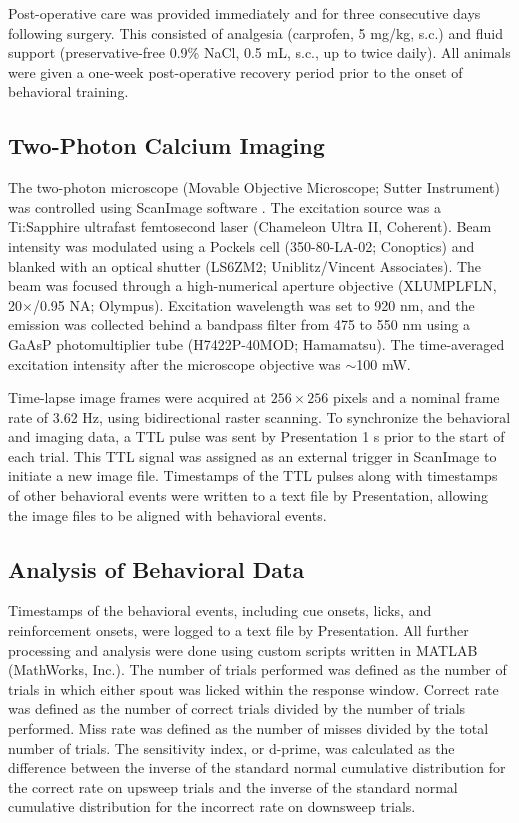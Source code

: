 Post-operative care was provided immediately and for three consecutive days following surgery. This consisted of analgesia (carprofen, 5 mg/kg, s.c.) and fluid support (preservative-free 0.9\% NaCl, 0.5 mL, s.c., up to twice daily). All animals were given a one-week post-operative recovery period prior to the onset of behavioral training.

\subsection*{Two-Photon Calcium Imaging}
The two-photon microscope (Movable Objective Microscope; Sutter Instrument) was controlled using ScanImage software \citep{pologruto2003scanimage}. The excitation source was a Ti:Sapphire ultrafast femtosecond laser (Chameleon Ultra II, Coherent). Beam intensity was modulated using a Pockels cell (350-80-LA-02; Conoptics) and blanked with an optical shutter (LS6ZM2; Uniblitz/Vincent Associates). The beam was focused through a high-numerical aperture objective (XLUMPLFLN, 20$\times$/0.95 NA; Olympus). Excitation wavelength was set to 920 nm, and the emission was collected behind a bandpass filter from 475 to 550 nm using a GaAsP photomultiplier tube (H7422P-40MOD; Hamamatsu). The time-averaged excitation intensity after the microscope objective was $\sim$100 mW. 

Time-lapse image frames were acquired at $256 \times 256$ pixels and a nominal frame rate of 3.62 Hz, using bidirectional raster scanning. To synchronize the behavioral and imaging data, a TTL pulse was sent by Presentation 1 s prior to the start of each trial. This TTL signal was assigned as an external trigger in ScanImage to initiate a new image file. Timestamps of the TTL pulses along with timestamps of other behavioral events were written to a text file by Presentation, allowing the image files to be aligned with behavioral events.

\subsection*{Analysis of Behavioral Data}
Timestamps of the behavioral events, including cue onsets, licks, and reinforcement onsets, were logged to a text file by Presentation. All further processing and analysis were done using custom scripts written in MATLAB (MathWorks, Inc.). The number of trials performed was defined as the number of trials in which either spout was licked within the response window. Correct rate was defined as the number of correct trials divided by the number of trials performed. Miss rate was defined as the number of misses divided by the total number of trials. The sensitivity index, or d-prime, was calculated as the difference between the inverse of the standard normal cumulative distribution for the correct rate on upsweep trials and the inverse of the standard normal cumulative distribution for the incorrect rate on downsweep trials.

